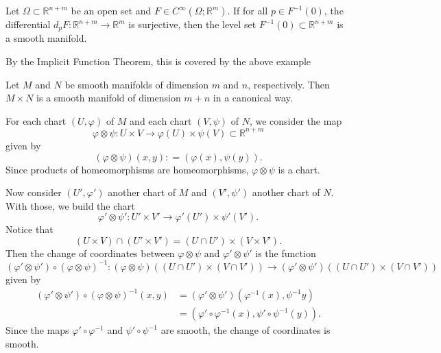 \documentclass{ximera}
\begin{document}
    \begin{example}
        Let $\Omega \subset \mathbb{R}^{n+m} $ be an open set and $F \in C^{\infty} ( \Omega ; \mathbb{R}^m  )$. If for all $p \in F^{-1} (0)$, the differential $d_pF : \mathbb{R}^{n+m} \to \mathbb{R}^m$ is surjective, then the level set $F^{-1}(0) \subset \mathbb{R}^{n+m}$ is a smooth manifold.  


    \begin{solution}
    By the Implicit Function Theorem, this is covered by the  above example
    \end{solution}
    \end{example}



    \begin{example}[Products]
        Let $M$ and $N$ be smooth manifolds of dimension $m$ and $n$, respectively. Then $M \times N$ is a smooth manifold of dimension $m + n$ in a canonical way.

    \begin{solution}
        For each chart $(U, \varphi)$ of $M$ and each chart $(V, \psi) $ of $N$, we consider the map
        \[    \varphi \otimes \psi : U \times V \to \varphi (U) \times \psi (V)  \subset \mathbb{R}^{n+m}       \]
        given by 
        \[  (\varphi \otimes \psi ) (x,y) : = (\varphi (x), \psi (y)). \]
        Since products of homeomorphisms are homeomorphisms, $\varphi \otimes \psi$ is a chart.  
        
        
        Now consider  $(U', \varphi ' )$ another chart of $M$ and $(V' , \psi ' ) $ another chart of $N$. With those, we build the chart
        \[      \varphi ' \otimes \psi ' : U ' \times V' \to \varphi ' (U ' ) \times \psi ' (V ' )   .        \] 
        Notice that 
        \[    (U \times V) \cap (U ' \times V' ) = (U \cap U') \times (V \times V')   .       \]
        Then the change of coordinates between $\varphi \otimes \psi $ and $\varphi ' \otimes \psi ' $ is the function 
        \[       (\varphi ' \otimes \psi ') \circ (\varphi \otimes  \psi ) ^{-1} : ( \varphi  \otimes \psi ) ( ( U \cap U ' ) \times (V \cap V') )  \to ( \varphi ' \otimes \psi ' ) ( ( U \cap U ' ) \times (V \cap V') )                    \]
        given by 
        \begin{align*}
             (\varphi ' \otimes \psi '  ) \circ (\varphi \otimes \psi ) ^{-1}  (x,y)  & = (\varphi ' \otimes \psi '  ) (\varphi ^{-1} (x) , \psi ^{-1}   y)  \\
             & =  ( \varphi ' \circ \varphi ^{-1} (x) , \psi ' \circ \psi ^{-1} (y) ) .
        \end{align*}
        Since the maps $\varphi ' \circ \varphi ^{-1}$ and $\psi ' \circ \psi ^{-1}$ are smooth, the change of coordinates is smooth.
    \end{solution}
    \end{example}
\end{document}
